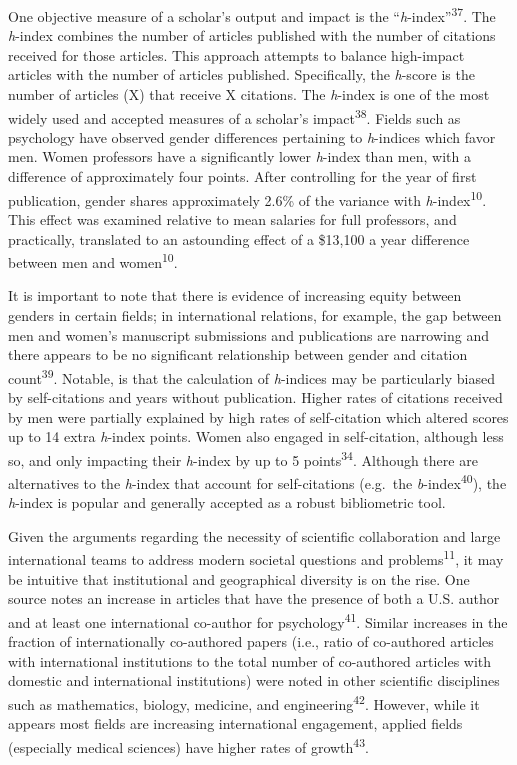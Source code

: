 \documentclass[
  man,floatsintext]{apa6}
\begin{document}
One objective measure of a scholar's output and impact is the ``\emph{h}-index''\textsuperscript{37}. The \emph{h}-index combines the number of articles published with the number of citations received for those articles. This approach attempts to balance high-impact articles with the number of articles published. Specifically, the \emph{h}-score is the number of articles (X) that receive X citations. The \emph{h}-index is one of the most widely used and accepted measures of a scholar's impact\textsuperscript{38}. Fields such as psychology have observed gender differences pertaining to \emph{h}-indices which favor men. Women professors have a significantly lower \emph{h}-index than men, with a difference of approximately four points. After controlling for the year of first publication, gender shares approximately 2.6\% of the variance with \emph{h}-index\textsuperscript{10}. This effect was examined relative to mean salaries for full professors, and practically, translated to an astounding effect of a \$13,100 a year difference between men and women\textsuperscript{10}.

It is important to note that there is evidence of increasing equity between genders in certain fields; in international relations, for example, the gap between men and women's manuscript submissions and publications are narrowing and there appears to be no significant relationship between gender and citation count\textsuperscript{39}. Notable, is that the calculation of \emph{h}-indices may be particularly biased by self-citations and years without publication. Higher rates of citations received by men were partially explained by high rates of self-citation which altered scores up to 14 extra \emph{h}-index points. Women also engaged in self-citation, although less so, and only impacting their \emph{h}-index by up to 5 points\textsuperscript{34}. Although there are alternatives to the \emph{h}-index that account for self-citations (e.g.~the \emph{b}-index\textsuperscript{40}), the \emph{h}-index is popular and generally accepted as a robust bibliometric tool.

Given the arguments regarding the necessity of scientific collaboration and large international teams to address modern societal questions and problems\textsuperscript{11}, it may be intuitive that institutional and geographical diversity is on the rise. One source notes an increase in articles that have the presence of both a U.S. author and at least one international co-author for psychology\textsuperscript{41}. Similar increases in the fraction of internationally co-authored papers (i.e., ratio of co-authored articles with international institutions to the total number of co-authored articles with domestic and international institutions) were noted in other scientific disciplines such as mathematics, biology, medicine, and engineering\textsuperscript{42}. However, while it appears most fields are increasing international engagement, applied fields (especially medical sciences) have higher rates of growth\textsuperscript{43}.
\end{document}
